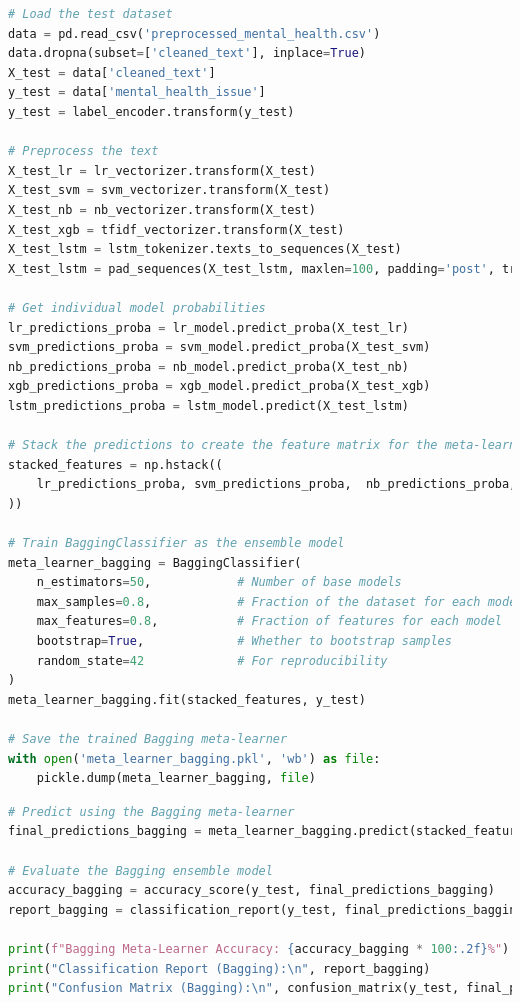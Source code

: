 \begin{tcolorbox}[colback=gray!5!white, colframe=gray!80!black, boxrule=0.5pt, title=Evaluate Bagging Meta-Learner and Ensemble Model 4]
    \begin{lstlisting}[language=Python]
# Load the test dataset
data = pd.read_csv('preprocessed_mental_health.csv')
data.dropna(subset=['cleaned_text'], inplace=True)
X_test = data['cleaned_text']
y_test = data['mental_health_issue']
y_test = label_encoder.transform(y_test)

# Preprocess the text
X_test_lr = lr_vectorizer.transform(X_test)
X_test_svm = svm_vectorizer.transform(X_test)
X_test_nb = nb_vectorizer.transform(X_test)
X_test_xgb = tfidf_vectorizer.transform(X_test)
X_test_lstm = lstm_tokenizer.texts_to_sequences(X_test)
X_test_lstm = pad_sequences(X_test_lstm, maxlen=100, padding='post', truncating='post')

# Get individual model probabilities
lr_predictions_proba = lr_model.predict_proba(X_test_lr)
svm_predictions_proba = svm_model.predict_proba(X_test_svm)
nb_predictions_proba = nb_model.predict_proba(X_test_nb)
xgb_predictions_proba = xgb_model.predict_proba(X_test_xgb)
lstm_predictions_proba = lstm_model.predict(X_test_lstm)

# Stack the predictions to create the feature matrix for the meta-learner
stacked_features = np.hstack((
    lr_predictions_proba, svm_predictions_proba,  nb_predictions_proba, xgb_predictions_proba,  lstm_predictions_proba
))

# Train BaggingClassifier as the ensemble model
meta_learner_bagging = BaggingClassifier(
    n_estimators=50,            # Number of base models
    max_samples=0.8,            # Fraction of the dataset for each model
    max_features=0.8,           # Fraction of features for each model
    bootstrap=True,             # Whether to bootstrap samples
    random_state=42             # For reproducibility
)
meta_learner_bagging.fit(stacked_features, y_test)

# Save the trained Bagging meta-learner
with open('meta_learner_bagging.pkl', 'wb') as file:
    pickle.dump(meta_learner_bagging, file)
\end{lstlisting}
\end{tcolorbox}
\begin{tcolorbox}[colback=gray!5!white, colframe=gray!80!black, boxrule=0.5pt, title=Evaluate Meta-Learner and Ensemble Model 4]
    \begin{lstlisting}[language=Python]
# Predict using the Bagging meta-learner
final_predictions_bagging = meta_learner_bagging.predict(stacked_features)

# Evaluate the Bagging ensemble model
accuracy_bagging = accuracy_score(y_test, final_predictions_bagging)
report_bagging = classification_report(y_test, final_predictions_bagging, target_names=label_encoder.classes_)

print(f"Bagging Meta-Learner Accuracy: {accuracy_bagging * 100:.2f}%")
print("Classification Report (Bagging):\n", report_bagging)
print("Confusion Matrix (Bagging):\n", confusion_matrix(y_test, final_predictions_bagging))
    \end{lstlisting}
\end{tcolorbox}

